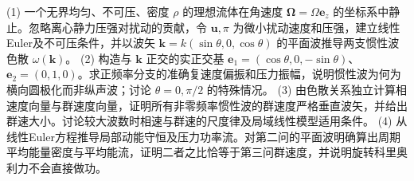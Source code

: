 (1) 一个无界均匀、不可压、密度 \(\rho\) 的理想流体在角速度 \(\boldsymbol\Omega=\Omega\mathbf e_z\) 的坐标系中静止。忽略离心静力压强对扰动的贡献，令 \(\mathbf u,\pi\) 为微小扰动速度和压强，建立线性Euler及不可压条件，并以波矢 \(\mathbf k=k(\sin\theta,0,\cos\theta)\) 的平面波推导两支惯性波色散 \(\omega(\mathbf k)\)。
(2) 构造与 \(\mathbf k\) 正交的实正交基 \(\mathbf e_1=(\cos\theta,0,-\sin\theta)\)、\(\mathbf e_2=(0,1,0)\)。求正频率分支的准确复速度偏振和压力振幅，说明惯性波为何为横向圆极化而非纵声波；讨论 \(\theta=0,\pi/2\) 的特殊情况。
(3) 由色散关系独立计算相速度向量与群速度向量，证明所有非零频率惯性波的群速度严格垂直波矢，并给出群速大小。讨论较大波数时相速与群速的尺度律及局域线性模型适用条件。
(4) 从线性Euler方程推导局部动能守恒及压力功率流。对第二问的平面波明确算出周期平均能量密度与平均能流，证明二者之比恰等于第三问群速度，并说明旋转科里奥利力不会直接做功。
